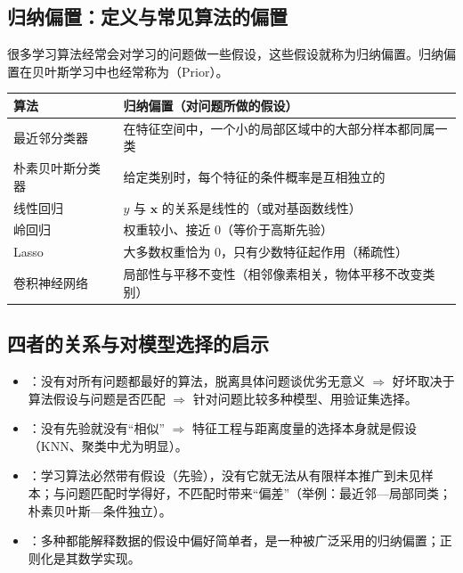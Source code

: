 \subsection{归纳偏置：定义与常见算法的偏置}
\begin{defn}
很多学习算法经常会对学习的问题做一些假设，这些假设就称为归纳偏置。归纳偏置在贝叶斯学习中也经常称为（Prior）。
\end{defn}
\begin{center}\small\renewcommand{\arraystretch}{1.1}
\begin{tabularx}{\linewidth}{@{}p{3.6cm}L@{}}
\toprule
算法 & 归纳偏置（对问题所做的假设） \\
\midrule
最近邻分类器 & 在特征空间中，一个小的局部区域中的大部分样本都同属一类 \\
朴素贝叶斯分类器 & 给定类别时，每个特征的条件概率是互相独立的 \\
线性回归 & $y$ 与 $\bm x$ 的关系是线性的（或对基函数线性） \\
岭回归 & 权重较小、接近 0（等价于高斯先验） \\
Lasso & 大多数权重恰为 0，只有少数特征起作用（稀疏性） \\
卷积神经网络 & 局部性与平移不变性（相邻像素相关，物体平移不改变类别） \\
\bottomrule
\end{tabularx}
\end{center}

\subsection{四者的关系与对模型选择的启示}\label{sec:D01b-four}
\begin{itemize}
\item {}：没有对所有问题都最好的算法，脱离具体问题谈优劣无意义 $\Rightarrow$ 好坏取决于算法假设与问题是否匹配 $\Rightarrow$ 针对问题比较多种模型、用验证集选择。
\item {}：没有先验就没有“相似” $\Rightarrow$ 特征工程与距离度量的选择本身就是假设（KNN、聚类中尤为明显）。
\item {}：学习算法必然带有假设（先验），没有它就无法从有限样本推广到未见样本；与问题匹配时学得好，不匹配时带来“偏差”（举例：最近邻—局部同类；朴素贝叶斯—条件独立）。
\item {}：多种都能解释数据的假设中偏好简单者，是一种被广泛采用的归纳偏置；正则化是其数学实现。
\end{itemize}

